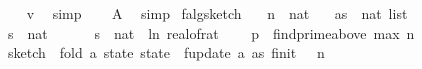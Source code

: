 \begin{isabellebody}
\ \ \ \ \isamarkupfalse%
\ v{\isacharunderscore}{\kern0pt}{}\ \isamarkupfalse%
\ simp\isanewline
\isanewline
\ \ \isamarkupfalse%
\ {\isacharquery}{\kern0pt}A\ \isamarkupfalse%
\ simp\isanewline
{}\isamarkupfalse%
%
\endisatagproof
{\isafoldproof}%
%
\isadelimproof
\isanewline
%
\endisadelimproof
\isanewline
{}\isamarkupfalse%
\ f{}{\isacharunderscore}{\kern0pt}alg{\isacharunderscore}{\kern0pt}sketch{\isacharcolon}{\kern0pt}\isanewline
\ \ \ n\ {\isacharcolon}{\kern0pt}{\isacharcolon}{\kern0pt}\ nat\isanewline
\ \ \ as\ {\isacharcolon}{\kern0pt}{\isacharcolon}{\kern0pt}\ {\isachardoublequoteopen}nat\ list{\isachardoublequoteclose}\isanewline
\ \ \ {\isachardoublequoteopen}{\isasymepsilon}\ {\isasymin}\ {\isacharbraceleft}{\kern0pt}{}{\isacharless}{\kern0pt}{\isachardot}{\kern0pt}{\isachardot}{\kern0pt}{\isacharless}{\kern0pt}{}{\isacharbraceright}{\kern0pt}{\isachardoublequoteclose}\isanewline
\ \ \ {\isachardoublequoteopen}{\isasymdelta}\ {\isachargreater}{\kern0pt}\ {}{\isachardoublequoteclose}\isanewline
\ \ \ {\isachardoublequoteopen}s\ {\isasymequiv}\ nat\ {\isasymlceil}{}\ {\isacharslash}{\kern0pt}\ {\isasymdelta}\isanewline
\ \ \ {\isachardoublequoteopen}s\ {\isasymequiv}\ nat\ {\isasymlceil}{\isacharminus}{\kern0pt}{\isacharparenleft}{\kern0pt}{}{}{\isacharasterisk}{\kern0pt}\ ln\ {\isacharparenleft}{\kern0pt}real{\isacharunderscore}{\kern0pt}of{\isacharunderscore}{\kern0pt}rat\ {\isasymepsilon}{\isacharparenright}{\kern0pt}{\isacharparenright}{\kern0pt}{\isasymrceil}{\isachardoublequoteclose}\isanewline
\ \ \ {\isachardoublequoteopen}p\ {\isasymequiv}\ find{\isacharunderscore}{\kern0pt}prime{\isacharunderscore}{\kern0pt}above\ {\isacharparenleft}{\kern0pt}max\ n\ {}{\isacharparenright}{\kern0pt}{\isachardoublequoteclose}\isanewline
\ \ \ {\isachardoublequoteopen}sketch\ {\isasymequiv}\ fold\ {\isacharparenleft}{\kern0pt}{\isasymlambda}a\ state{\isachardot}{\kern0pt}\ state\ {\isasymbind}\ f{}{\isacharunderscore}{\kern0pt}update\ a{\isacharparenright}{\kern0pt}\ as\ {\isacharparenleft}{\kern0pt}f{}{\isacharunderscore}{\kern0pt}init\ {\isasymdelta}\ {\isasymepsilon}\ n{\isacharparenright}{\kern0pt}{\isachardoublequoteclose}\isanewline

\end{isabellebody}
